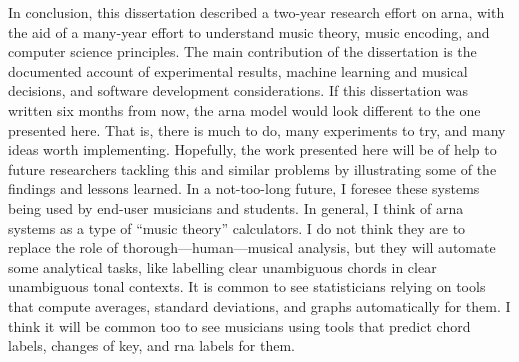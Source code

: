 
In conclusion, this dissertation described a two-year
research effort on \gls{arna}, with the aid of a many-year
effort to understand music theory, music encoding, and
computer science principles. The main contribution of the
dissertation is the documented account of experimental
results, machine learning and musical decisions, and
software development considerations. If this dissertation
was written six months from now, the \gls{arna} model would
look different to the one presented here. That is, there is
much to do, many experiments to try, and many ideas worth
implementing. Hopefully, the work presented here will be of
help to future researchers tackling this and similar
problems by illustrating some of the findings and lessons
learned. In a not-too-long future, I foresee these systems
being used by end-user musicians and students. In general, I
think of \gls{arna} systems as a type of ``music theory''
calculators. I do not think they are to replace the role of
thorough---human---musical analysis, but they will automate
some analytical tasks, like labelling clear unambiguous
chords in clear unambiguous tonal contexts. It is common to
see statisticians relying on tools that compute averages,
standard deviations, and graphs automatically for them. I
think it will be common too to see musicians using tools
that predict chord labels, changes of key, and \gls{rna}
labels for them.
